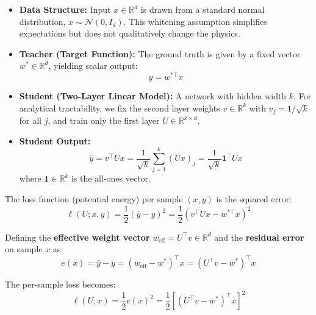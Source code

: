 \documentclass[
  journal=largetwo,
  year=2025,
  volume=37,
]{cup-journal}
\begin{document}
\begin{itemize}
    \item \textbf{Data Structure:} Input $x \in \mathbb{R}^d$ is drawn from a standard normal distribution, $x \sim \mathcal{N}(0, I_d)$. This whitening assumption simplifies expectations but does not qualitatively change the physics.
    
    \item \textbf{Teacher (Target Function):} The ground truth is given by a fixed vector $w^* \in \mathbb{R}^d$, yielding scalar output:
    \begin{equation}
        y = w^{*\top} x
    \end{equation}
    
    \item \textbf{Student (Two-Layer Linear Model):} A network with hidden width $k$. For analytical tractability, we fix the second layer weights $v \in \mathbb{R}^k$ with $v_j = 1/\sqrt{k}$ for all $j$, and train only the first layer $U \in \mathbb{R}^{k \times d}$.
    
    \item \textbf{Student Output:}
    \begin{equation}
        \hat{y} = v^\top U x = \frac{1}{\sqrt{k}} \sum_{j=1}^{k} (U x)_j = \frac{1}{\sqrt{k}} \mathbf{1}^\top U x
    \end{equation}
    where $\mathbf{1} \in \mathbb{R}^k$ is the all-ones vector.
\end{itemize}


The loss function (potential energy) per sample $(x, y)$ is the squared error:
\begin{equation}\label{eq:loss_persample}
    \ell(U; x, y) = \frac{1}{2} (\hat{y} - y)^2 = \frac{1}{2} \left( v^\top U x - w^{*\top} x \right)^2
\end{equation}

Defining the \textbf{effective weight vector} $w_{\text{eff}} = U^\top v \in \mathbb{R}^d$ and the \textbf{residual error} on sample $x$ as:
\begin{equation}
    e(x) = \hat{y} - y = (w_{\text{eff}} - w^*)^\top x = (U^\top v - w^*)^\top x
\end{equation}

The per-sample loss becomes:
\begin{equation}
    \ell(U; x) = \frac{1}{2} e(x)^2 = \frac{1}{2} \left[ (U^\top v - w^*)^\top x \right]^2
\end{equation}
\end{document}
